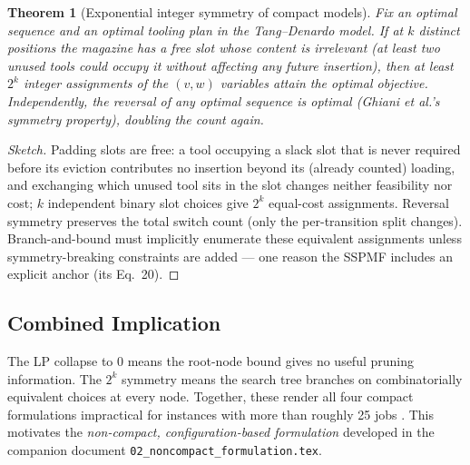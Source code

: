 \documentclass[11pt,a4paper]{article}
\theoremstyle{plain}
\newtheorem{theorem}{Theorem}[section]
\theoremstyle{definition}
\begin{document}
\begin{thmbox}
\begin{theorem}[Exponential integer symmetry of compact models]
\label{thm:symmetry}
Fix an optimal sequence and an optimal tooling plan in the Tang--Denardo model.
If at $k$ distinct positions the magazine has a free slot whose content is
irrelevant (at least two unused tools could occupy it without affecting any
future insertion), then at least $2^k$ integer assignments of the $(v,w)$
variables attain the optimal objective. Independently, the reversal of any
optimal sequence is optimal (Ghiani et al.'s symmetry property), doubling the
count again.
\end{theorem}
\end{thmbox}

\begin{proofbox}
\begin{proof}[Sketch]
Padding slots are free: a tool occupying a slack slot that is never required
before its eviction contributes no insertion beyond its (already counted)
loading, and exchanging which unused tool sits in the slot changes neither
feasibility nor cost; $k$ independent binary slot choices give $2^k$ equal-cost
assignments. Reversal symmetry preserves the total switch count (only the
per-transition split changes). Branch-and-bound must implicitly enumerate these
equivalent assignments unless symmetry-breaking constraints are added --- one
reason the SSPMF includes an explicit anchor (its Eq.~20).
\end{proof}
\end{proofbox}

\subsection{Combined Implication}

The LP collapse to 0 means the root-node bound gives no useful pruning
information. The $2^k$ symmetry means the search tree branches on
combinatorially equivalent choices at every node. Together, these render
all four compact formulations impractical for instances with more than
roughly 25 jobs \cite{Laporte2004,Catanzaro2015}. This motivates the
\emph{non-compact, configuration-based formulation} developed in the
companion document \texttt{02\_noncompact\_formulation.tex}.



\end{document}
